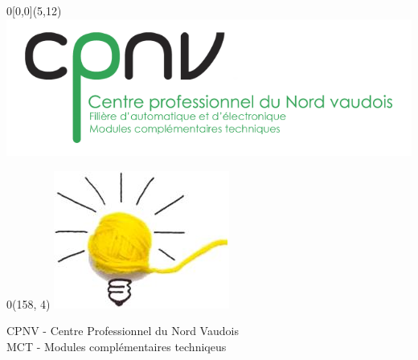 \documentclass[
	a4paper,									%
	11pt,										%
	twoside,									%
	openright,									%
	notitlepage,									%
	parskip=half,								%
]{scrreprt}										%
\begin{document}
\begin{titlepage}
	\setlength{\unitlength}{1mm}

	\begin{textblock}{0}[0,0](5,12) %
		\includegraphics[scale=1]{img/logoCPNV.png}
	\end{textblock}

	\begin{textblock}{0}(158, 4)
		\includegraphics[scale=.7]{img/logoMCT.jpg}
	\end{textblock}





	
	\flushleft
	\vspace*{1cm}
	\fontsize{18pt}{20pt}\selectfont
	CPNV - Centre Professionnel du Nord Vaudois \\
	\fontsize{12pt}{15pt}\selectfont\vspace{0.5em}
	MCT - Modules complémentaires techniqeus


\end{titlepage}
\end{document}
